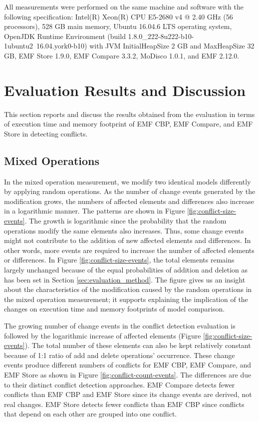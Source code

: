 All measurements were performed on the same machine and software with the following specification: Intel(R) Xeon(R) CPU E5-2680 v4 @ 2.40 GHz (56 processors), 528 GB main memory, Ubuntu 16.04.6 LTS operating system, OpenJDK Runtime Environment (build 1.8.0\_222-8u222-b10-1ubuntu2~16.04.york0-b10) with JVM \textsf{InitialHeapSize} 2 GB and \textsf{MaxHeapSize} 32 GB, EMF Store 1.9.0, EMF Compare 3.3.2, MoDisco 1.0.1, and EMF 2.12.0.

\section{Evaluation Results and Discussion}
\label{sec:evaluation_discussion}
This section reports and discuss the results obtained from the evaluation in terms of execution time and memory footprint of EMF CBP, EMF Compare, and EMF Store in detecting conflicts.

\subsection{Mixed Operations}
\label{sec:mixed-operation_conflict}

In the mixed operation measurement, we modify two identical models differently by applying random operations. As the number of change events generated by the modification grows, the numbers of affected elements and differences also increase in a logarithmic manner. The patterns are shown in Figure \ref{fig:conflict-size-events}. The growth is logarithmic since the probability that the random operations modify the same elements also increases. Thus, some change events might not contribute to the addition of new affected elements and differences. In other words, more events are required to increase the number of affected elements or differences. In Figure \ref{fig:conflict-size-events}, the total elements remains largely unchanged because of the equal probabilities of addition and deletion as has been set in Section \ref{sec:evaluation_method}. The figure gives us an insight about the characteristics of the modification caused by the random operations in the mixed operation measurement; it supports explaining the implication of the changes on execution time and memory footprints of model comparison.

The growing number of change events in the conflict detection evaluation is followed by the logarithmic increase of affected elements (Figure \ref{fig:conflict-size-events}). The total number of these elements can also be kept relatively constant because of 1:1 ratio of \textsf{add} and \textsf{delete} operations’ occurrence. These change events produce different numbers of conflicts for EMF CBP, EMF Compare, and EMF Store as shown in Figure \ref{fig:conflict-count-events}. The differences are due to their distinct conflict detection approaches. EMF Compare detects fewer conflicts than EMF CBP and EMF Store since its change events are derived, not real changes. EMF Store detects fewer conflicts than EMF CBP since conflicts that depend on each other are grouped into one conflict.

